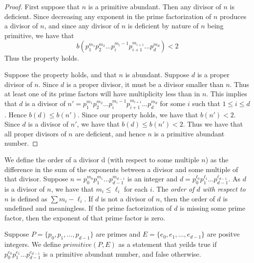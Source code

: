 \documentclass[../paper.tex]{subfiles}
\begin{document}
\begin{proof}
	First suppose that $n$ is a primitive abundant. Then any divisor of $n$
is deficient. Since decreasing any exponent in the prime 
factorization of $n$ produces a divisor of $n$, and since any
divisor of $n$ is deficient by nature of $n$ being primitive,
we have that 
$$b(p_1^{m_1} p_2^{m_2} ...   p_i^{m_i - 1} p_{i+1}^{m_{i+1}}
... p_d^{m_d}) < 2$$
Thus the property holds.

	Suppose the property holds, and that $n$ is abundant. Suppose $d$
is a proper divisor of $n$. Since $d$ is a proper divisor, it must
be a divisor smaller than $n$. Thus at least one of its prime factors
will have multiplicity less than in $n$. This implies that $d$ is a 
divisor of
$n' = p_1^{m_1} p_2^{m_2} ...   p_i^{m_i - 1} p_{i+1}^{m_{i+1}}
... p_d^{m_d}$ 
for some $i$ such that $1 \leq i \leq d$. Hence $b(d) \leq b(n')$.
Since our property holds, we have that $b(n') < 2$. Since $d$ is
a divisor of $n'$, we have that $b(d) \leq b(n') < 2$. Thus we
have that all proper divisors of $n$ are deficient, and hence $n$ is 
a primitive abundant number.
\end{proof}

We define the order of a divisor d (with respect to some multiple
$n$) as the difference in the sum of the exponents between a
divisor and some multiple of that divisor. Suppose $n = p_0^{m_0}
p_1^{m_1} ... p_{d-1}^{m_{d-1}}$ is an integer and $d = p_0^{\ell_0}
p_1^{\ell_1} ... p_{d-1}^{\ell_{d-1}}$. As $d$ is a divisor of
$n$, we have that $m_i \leq \ell_i$ for each $i$. The
\textit{order of $d$ with respect to $n$} is defined as $\sum {m_i
- \ell_i}$. If $d$ is not a divisor of $n$, then the order of $d$
is undefined and meaningless. If the prime factorization of $d$ is
missing some prime factor, then the exponent of that prime factor
is zero.


Suppose $P = \{p_0, p_1, ...,p_{d-1}\}$ are primes and 
$E = \{e_0, e_1, ..., e_{d-1} \}$ are positve integers.
We define $primitive(P,E)$ as a statement that yeilds true
if $p_0^{e_0} p_1^{e_1} ... p_{d-1}^{e_{d-1}}$ is a primitive
abundant number, and false otherwise.

\end{document}
